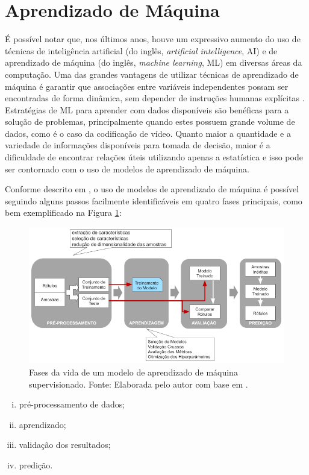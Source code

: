 \section{Aprendizado de Máquina}
\label{cap:2.2}

É possível notar que, nos últimos anos, houve um expressivo aumento do uso de técnicas de inteligência artificial (do inglês, \textit{artificial intelligence}, AI) e de aprendizado de máquina (do inglês, \textit{machine learning}, ML) em diversas áreas da computação. Uma das grandes vantagens de utilizar técnicas de aprendizado de máquina é garantir que associações entre variáveis independentes possam ser encontradas de forma dinâmica, sem depender de instruções humanas explícitas \citet{bib:livroRaschka}. Estratégias de ML para aprender com dados disponíveis são benéficas para a solução de problemas, principalmente quando estes possuem grande volume de dados, como é o caso da codificação de vídeo. Quanto maior a quantidade e a variedade de informações disponíveis para tomada de decisão, maior é a dificuldade de encontrar relações úteis utilizando apenas a estatística e isso pode ser contornado com o uso de modelos de aprendizado de máquina.

Conforme descrito em \citet{bib:livroRaschka}, o uso de modelos de aprendizado de máquina é possível seguindo alguns passos facilmente identificáveis em quatro fases principais, como bem exemplificado na Figura \ref{fig:6}: 

\begin{figure}
    \centering
    \includegraphics[width=\textwidth]{FIGURES/fig_6.png}
    \caption{Fases da vida de um modelo de aprendizado de máquina supervisionado. Fonte: Elaborada pelo autor com base em \citet{bib:livroRaschka}.}
    \label{fig:6}
\end{figure}

\begin{enumerate}[(i)]
    \item pré-processamento de dados;

    \item aprendizado;

    \item validação dos resultados;

    \item predição.
\end{enumerate}

